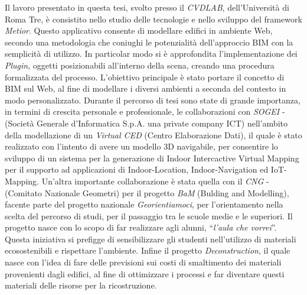 Il lavoro presentato in questa tesi, svolto presso il \emph{CVDLAB},
dell'Università di Roma Tre, è consistito nello studio delle tecnologie e nello sviluppo del
framework \emph{Metior}.
Questo applicativo consente di modellare edifici in ambiente Web, secondo una metodologia che coniughi le potenzialità
dell’approccio BIM con la semplicità di utilizzo.
In particolar modo si è approfondita l'implementazione dei \emph{Plugin}, oggetti posizionabili all'interno della scena, creando
una procedura formalizzata del processo.
L'obiettivo principale è stato portare il concetto di BIM sul Web, al fine di modellare i diversi ambienti a seconda del
contesto in modo personalizzato.
Durante il percorso di tesi sono state di grande importanza, in termini di crescita personale e professionale,
le collaborazioni con \emph{SOGEI} - (Società Generale d'Informatica S.p.A. una private company ICT)
nell'ambito della modellazione di un \emph{Virtual CED} (Centro Elaborazione Dati),
il quale \`e stato realizzato con l'intento di avere un modello 3D navigabile, per consentire lo sviluppo di un sistema per
la generazione di Indoor Intercactive Virtual Mapping per il supporto ad applicazioni di Indoor-Location, Indoor-Navigation
ed IoT-Mapping.
Un'altra importante collaborazione è stata quella con il \emph{CNG} - (Comitato Nazionale Geometri) per il progetto \emph{BaM}
(Bulding and Modelling),
facente parte del progetto nazionale \emph{Georientiamoci}, per l'orientamento nella scelta del percorso di studi,
per il passaggio tra le scuole medie e le superiori.
Il progetto nasce con lo scopo di far realizzare agli alunni, ``\emph{l'aula che vorrei}''.
Questa iniziativa si prefigge di sensibilizzare gli studenti nell'utilizzo di
materiali ecosostenibili e rispettare l'ambiente.
Infine il progetto \emph{Deconstruction}, il quale nasce con l'idea di fare delle previsioni
sui costi di smaltimento dei materiali provenienti dagli edifici, al fine di ottimizzare i processi e far
diventare questi materiali delle risorse per la ricostruzione.
